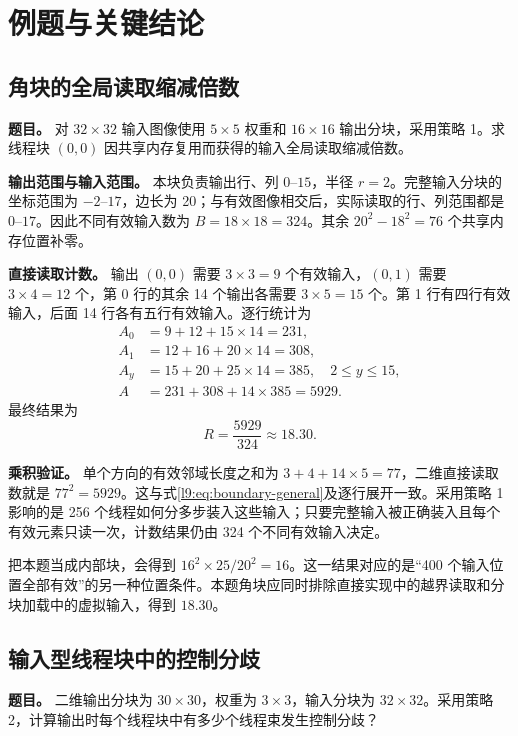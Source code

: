 \section{例题与关键结论}
\label{l9:sec:examples}

\subsection{角块的全局读取缩减倍数}
\textbf{题目。} 对 $32\times32$ 输入图像使用 $5\times5$ 权重和 $16\times16$ 输出分块，采用策略 1。求线程块 $(0,0)$ 因共享内存复用而获得的输入全局读取缩减倍数。

\textbf{输出范围与输入范围。} 本块负责输出行、列 $0$--$15$，半径 $r=2$。完整输入分块的坐标范围为 $-2$--$17$，边长为 20；与有效图像相交后，实际读取的行、列范围都是 $0$--$17$。因此不同有效输入数为 $B=18\times18=324$。其余 $20^2-18^2=76$ 个共享内存位置补零。

\textbf{直接读取计数。} 输出 $(0,0)$ 需要 $3\times3=9$ 个有效输入，$(0,1)$ 需要 $3\times4=12$ 个，第 0 行的其余 14 个输出各需要 $3\times5=15$ 个。第 1 行有四行有效输入，后面 14 行各有五行有效输入。逐行统计为
\begin{equation}
 \begin{aligned}
 A_0&=9+12+15\times14=231,\\
 A_1&=12+16+20\times14=308,\\
 A_y&=15+20+25\times14=385,\quad 2\le y\le15,\\
 A&=231+308+14\times385=5929.
 \end{aligned}
 \label{l9:eq:corner-rows}
\end{equation}
最终结果为
\begin{equation}
 \boxed{R=\frac{5929}{324}\approx18.30.}
 \label{l9:eq:corner-answer}
\end{equation}

\textbf{乘积验证。} 单个方向的有效邻域长度之和为 $3+4+14\times5=77$，二维直接读取数就是 $77^2=5929$。这与式\eqref{l9:eq:boundary-general}及逐行展开一致。采用策略 1 影响的是 256 个线程如何分多步装入这些输入；只要完整输入被正确装入且每个有效元素只读一次，计数结果仍由 324 个不同有效输入决定。

把本题当成内部块，会得到 $16^2\times25/20^2=16$。这一结果对应的是“400 个输入位置全部有效”的另一种位置条件。本题角块应同时排除直接实现中的越界读取和分块加载中的虚拟输入，得到 $18.30$。

\subsection{输入型线程块中的控制分歧}
\textbf{题目。} 二维输出分块为 $30\times30$，权重为 $3\times3$，输入分块为 $32\times32$。采用策略 2，计算输出时每个线程块中有多少个线程束发生控制分歧？

